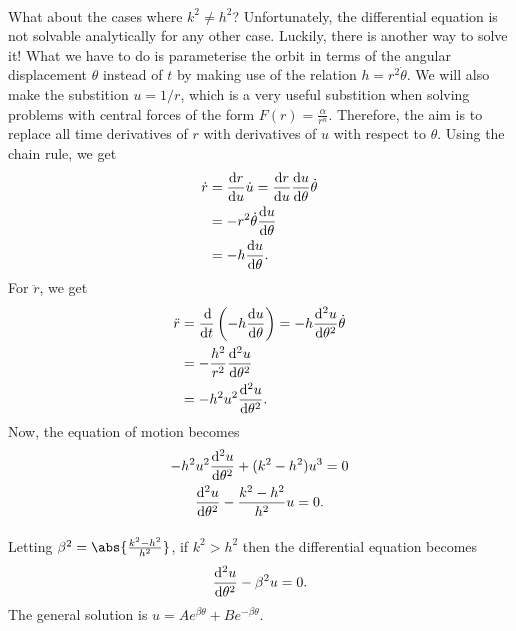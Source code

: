 \documentclass[../classical_mechanics.tex]{subfiles}
\begin{document}
\begin{example}
            \paragraph{}
            What about the cases where $k^2\neq h^2$?
            Unfortunately, the differential equation is not solvable analytically for any other case.
            Luckily, there is another way to solve it!
            What we have to do is parameterise the orbit in terms of the angular displacement $\theta$ instead of $t$ by making use of the relation $h=r^2\dot{\theta}$.
            We will also make the substition $u=1/r$, which is a very useful substition when solving problems with central forces of the form $F(r)=\frac{\alpha}{r^n}$.
            Therefore, the aim is to replace all time derivatives of $r$ with derivatives of $u$ with respect to $\theta$.
            Using the chain rule, we get
            \begin{align}
                \dot{r}&=\dv{r}{u}\dot{u}=\dv{r}{u}\dv{u}{\theta}\dot{\theta}\\
                &=-r^2\dot{\theta}\dv{u}{\theta}\\
                &=-h\dv{u}{\theta}.
            \end{align}
            For $\ddot{r}$, we get
            \begin{align}
                \ddot{r}&=\dv{}{t}\left(-h\dv{u}{\theta}\right)=-h\dv[2]{u}{\theta}\dot{\theta}\\
                &=-\frac{h^2}{r^2}\dv[2]{u}{\theta}\\
                &=-h^2u^2\dv[2]{u}{\theta}.
            \end{align}
            Now, the equation of motion becomes
            \begin{gather}
                -h^2u^2\dv[2]{u}{\theta}+(k^2-h^2)u^3=0\\
                \dv[2]{u}{\theta}-\frac{k^2-h^2}{h^2}u=0.
            \end{gather}

            \paragraph{}
            Letting $\beta^2=\abs{\frac{k^2-h^2}{h^2}}$, if $k^2>h^2$ then the differential equation becomes
            \begin{equation}
                \dv[2]{u}{\theta}-\beta^2 u=0.
            \end{equation}
            The general solution is $u=Ae^{\beta\theta}+Be^{-\beta\theta}$.


\end{example}
\end{document}
